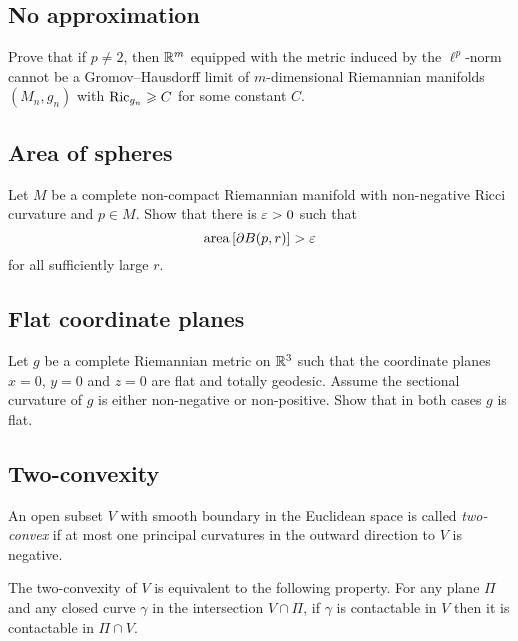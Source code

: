 \subsection*{No approximation\many}
\label{No approximation}

\begin{pr}
Prove that 
if $p\not=2$,
then $\mathbb{R}^m$ 
equipped with the metric induced by the $\ell^p$-norm 
cannot be a
Gromov--Hausdorff limit of
$m$-dimensional Riemannian manifolds $(M_n,g_n)$ with $\Ric_{g_n}\z\ge C$ for some constant $C$.
\end{pr}

\subsection*{Area of spheres}
\label{Area of spheres}

\begin{pr}
Let $M$ be a complete non-compact Riemannian manifold 
with non-negative Ricci curvature and $p\in M$.
Show that there is $\varepsilon>0$ such that 
$$\operatorname{\rm area}\nolimits\left[\partial B(p,r)\right]>\varepsilon$$
for all sufficiently large $r$.
\end{pr}

\subsection*{Flat coordinate planes}
\label{Flat coordinate planes}

\begin{pr}
Let $g$ be a complete Riemannian metric on $\mathbb{R}^3$ such that the coordinate planes $x=0$, $y=0$ and $z=0$ are flat and totally geodesic.
Assume the sectional curvature of $g$ is either non-negative or non-positive.
Show that in both cases $g$ is flat. 
\end{pr}

\subsection*{Two-convexity\many}
\label{Two-convexity}

An open subset $V$ with smooth boundary in the Euclidean space  
is called \emph{two-convex} if at most one principal curvatures in the outward direction to $V$ is negative.

The two-convexity of $V$ is equivalent to the following property.
For any plane $\Pi$ and any closed curve $\gamma$ in the intersection  $V\cap \Pi$,
if $\gamma$ is contactable in $V$ then it is contactable in $\Pi\cap V$.

